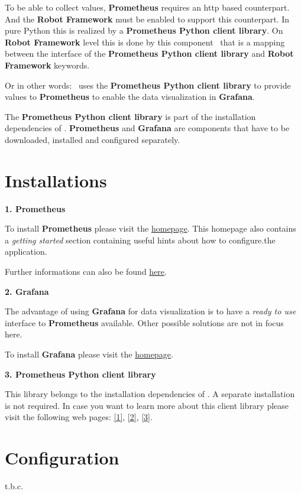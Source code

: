 To be able to collect values, \textbf{Prometheus} requires an http based counterpart. And the \textbf{Robot Framework} must be enabled to support this counterpart.
In pure Python this is realized by a \textbf{Prometheus Python client library}. On \textbf{Robot Framework} level this is done by this component \pkg\ that is a mapping
between the interface of the \textbf{Prometheus Python client library} and \textbf{Robot Framework} keywords.

Or in other words: \pkg\ uses the \textbf{Prometheus Python client library} to provide values to \textbf{Prometheus} to enable the data visualization in \textbf{Grafana}.

The \textbf{Prometheus Python client library} is part of the installation dependencies of \pkg. \textbf{Prometheus} and \textbf{Grafana} are components that
have to be downloaded, installed and configured separately.


\section{Installations}

\textbf{1. Prometheus}

To install \textbf{Prometheus} please visit the \href{https://prometheus.io/}{homepage}. This homepage also contains a \textit{getting started} section containing useful hints about how to configure.the application.

Further informations can also be found \href{https://www.fullstackpython.com/prometheus.html}{here}.

\textbf{2. Grafana}

The advantage of using \textbf{Grafana} for data visualization is to have a \textit{ready to use} interface to \textbf{Prometheus} available. Other possible solutions are not in focus here.

To install \textbf{Grafana} please visit the \href{https://grafana.com/}{homepage}.

\textbf{3. Prometheus Python client library}

This library belongs to the installation dependencies of \pkg. A separate installation is not required. In case you want to learn more about this client library please visit the following web pages:
\href{https://pypi.org/project/prometheus-client/}{[1]}, \href{https://prometheus.github.io/client_python/}{[2]}, \href{https://prometheus.io/docs/prometheus/latest/getting_started/}{[3]}.


\newpage

\section{Configuration}

t.b.c.







